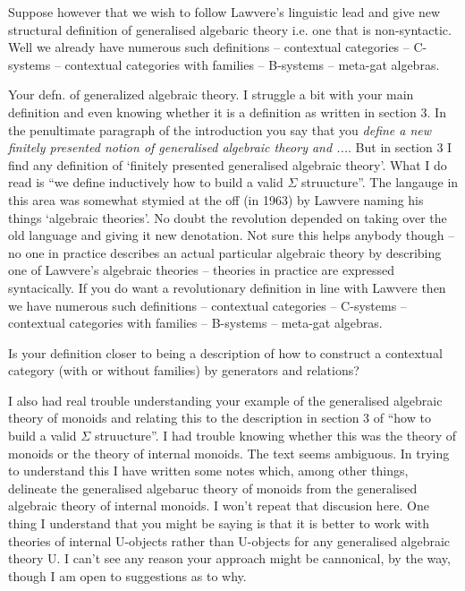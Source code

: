 Suppose however that we wish to follow  Lawvere's linguistic lead and give new structural definition of generalised algebaric theory i.e. one that is
non-syntactic. Well we already have numerous such definitions  --  contextual categories -- C-systems -- contextual categories with families -- B-systems -- meta-gat algebras.  

\note
Your defn. of generalized algebraic theory.
I struggle a bit with your main definition and even knowing whether it is a definition as written in section 3. 
In the penultimate paragraph of the introduction you say that you \textit{define
a new finitely presented notion of generalised algebraic theory and ...}. But in section 3 I find  any definition of `finitely presented generalised algebraic theory'.  
What I do read is
``we define inductively how to build a valid $\Sigma$ struucture''.
The langauge in this area was somewhat stymied at the off (in 1963) by Lawvere 
naming his things `algebraic theories'. No doubt the revolution depended on 
taking over the old language and giving it new denotation. Not sure this helps anybody though -- no one in practice describes an actual particular algebraic theory by describing one of Lawvere's algebraic theories  -- theories in practice are expressed syntacically. If you do want a revolutionary definition in line with Lawvere then we have numerous such definitions --  contextual categories -- C-systems -- contextual categories with families -- B-systems -- meta-gat algebras.   

Is your definition closer to being a description of how to construct a contextual category
(with or without families) by generators and relations?

\note
I also had real trouble understanding your example of the generalised algebraic theory of monoids 
and relating this to the description in section 3 of ``how to build a valid $\Sigma$ struucture''.
I had trouble knowing whether this was the theory of monoids or the theory of internal monoids.
The text seems ambiguous. In trying to understand this I have written some notes which, among other things, 
delineate the generalised algebaruc theory of monoids from the generalised algebraic theory
of internal monoids. I won't repeat that discusion here. 
One thing I understand that you might be saying is that it is better to work with theories of internal U-objects rather than U-objects
for any generalised algebraic theory U. I can't see any reason your approach might be cannonical, by the way, though I am open to suggestions as to why.

